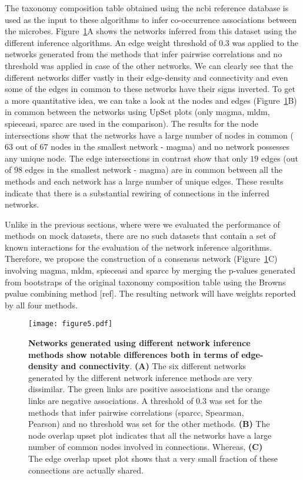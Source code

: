   The taxonomy composition table obtained using the \ac{ncbi} reference database is used as the input to these algorithms to infer co-occurrence associations between the microbes.
  Figure~\ref{fig:figure5}A shows the networks inferred from this dataset using the different inference algorithms.
  An edge weight threshold of 0.3 was applied to the networks generated from the methods that infer pairwise correlations and no threshold was applied in case of the other networks.
  We can clearly see that the different networks differ vastly in their edge-density and connectivity and even some of the edges in common to these networks have their signs inverted.
  To get a more quantitative idea, we can take a look at the nodes and edges (Figure~\ref{fig:figure5}B) in common between the networks using UpSet plots (only \ac{magma}, \ac{mldm}, \ac{spieceasi}, \ac{sparcc} are used in the comparison).
  The results for the node intersections show that the networks have a large number of nodes in common ($63$ out of $67$ nodes in the smallest network - \ac{magma}) and no network possesses any unique node.
  The edge intersections in contrast show that only $19$ edges (out of $98$ edges in the smallest network - \ac{magma}) are in common between all the methods and each network has a large number of unique edges.
  These results indicate that there is a substantial rewiring of connections in the inferred networks.

  Unlike in the previous sections, where were we evaluated the performance of methods on mock datasets, there are no such datasets that contain a set of known interactions for the evaluation of the network inference algorithms.
  Therefore, we propose the construction of a consensus network (Figure~\ref{fig:figure5}C) involving \ac{magma}, \ac{mldm}, \ac{spieceasi} and \ac{sparcc} by merging the p-values generated from bootstraps of the original taxonomy composition table using the Browns pvalue combining method [ref].
  The resulting network will have weights reported by all four methods.

  \begin{figure}[h]
    \centering
    \texttt{[image: figure5.pdf]}
    \caption{
      \textbf{Networks generated using different network inference methods show notable differences both in terms of edge-density and connectivity}.
      \textbf{(A)} The six different networks generated by the different network inference methods are very dissimilar.
      The green links are positive associations and the orange links are negative associations.
      A threshold of 0.3 was set for the methods that infer pairwise correlations (\ac{sparcc}, Spearman, Pearson) and no threshold was set for the other methods.
      \textbf{(B)} The node overlap upset plot indicates that all the networks have a large number of common nodes involved in connections.
      Whereas, \textbf{(C)} The edge overlap upset plot shows that a very small fraction of these connections are actually shared.
    }
    \label{fig:figure5}
  \end{figure}

